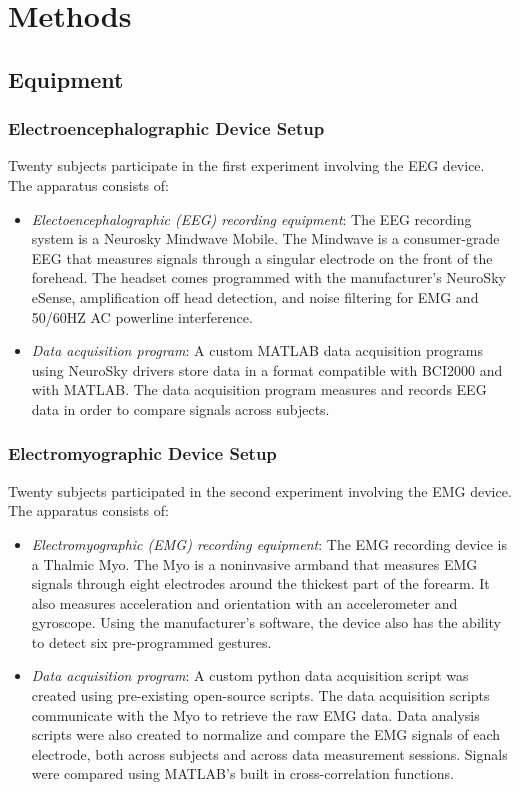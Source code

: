 \documentclass[journal]{IEEEtran}
\begin{document}
\section{Methods}
\subsection{Equipment}
\subsubsection{Electroencephalographic Device Setup}
Twenty subjects participate in the first experiment involving the EEG device.
The apparatus consists of:
\begin{itemize}
    \item \textit{Electoencephalographic (EEG) recording equipment}: The EEG recording system is a Neurosky Mindwave Mobile. The Mindwave is a consumer-grade EEG that measures signals through a singular electrode on the front of the forehead. The headset comes programmed with the manufacturer’s NeuroSky eSense, amplification off head detection, and noise filtering for EMG and 50/60HZ AC powerline interference. 
    \item \textit{Data acquisition program}: A custom MATLAB data acquisition programs using NeuroSky drivers store data in a format compatible with BCI2000 and with MATLAB.  The data acquisition program measures and records EEG data in order to compare signals across subjects.
\end{itemize}

\subsubsection{Electromyographic Device Setup}
Twenty subjects participated in the second experiment involving the EMG device.
The apparatus consists of: 
\begin{itemize}
    \item \textit{Electromyographic (EMG) recording equipment}: The EMG recording device is a Thalmic Myo. The Myo is a noninvasive armband that measures EMG signals through eight electrodes around the thickest part of the forearm. It also measures acceleration and orientation with an accelerometer and gyroscope. Using the manufacturer's software, the device also has the ability to detect six pre-programmed gestures.
    \item \textit{Data acquisition program}: A custom python data acquisition script was created using pre-existing open-source scripts. The data acquisition scripts communicate with the Myo to retrieve the raw EMG data. Data analysis scripts were also created to normalize and compare the EMG signals of each electrode, both across subjects and across data measurement sessions. Signals were compared using MATLAB's built in cross-correlation functions.
\end{itemize}
   
\end{document}
